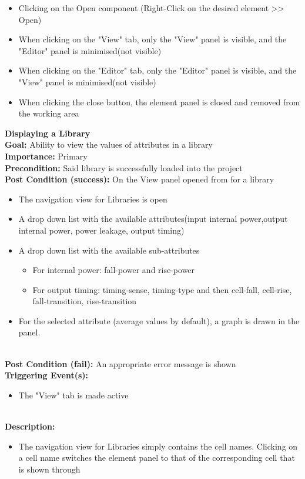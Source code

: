 \documentclass[10pt,a4paper]{report}
\newcommand{\precondition}[1]{
    \textbf{Precondition: } #1 \leavevmode \\
}
\newcommand{\FRDescription}[8]{
    \textbf{#1} \leavevmode \\
    \textbf{Goal: } #2 \leavevmode \\
    \textbf{Importance: } #3 \leavevmode \\
    \precondition{#4}
    \textbf{Post Condition (success): } #5 \leavevmode \\
    \textbf{Post Condition (fail): } #6 \leavevmode \\
    \textbf{Triggering Event(s): } #7 \leavevmode \\
    \textbf{Description: } \leavevmode \\ 
    #8}
\begin{document}
\begin{FR}
{\begin{itemize}
        \item Clicking on the Open component (Right-Click on the desired element >> Open)
    \end{itemize}}
    {\begin{itemize}
        \item When clicking on the "View" tab, only the "View" panel is visible, and the "Editor" panel is minimised(not visible)
        \item When clicking on the "Editor" tab, only the "Editor" panel is visible, and the "View" panel is minimised(not visible)
        \item When clicking the close button, the element panel is closed and removed from the working area 
    \end{itemize}}
    \item \FRDescription{Displaying a Library}
    {Ability to view the values of attributes in a library}
    {Primary}
    {Said library is successfully loaded into the project}
    {On the View panel opened from \label{FR-PREVIOUS} for a library
        \begin{itemize}
            \item The navigation view for Libraries is open
            \item A drop down list with the available attributes(input internal power,output internal power, power leakage, output timing)
            \item A drop down list with the available sub-attributes
            \begin{itemize}
                \item For internal power: fall-power and rise-power
                \item For output timing: timing-sense, timing-type and then cell-fall, cell-rise, fall-transition, rise-transition
            \end{itemize}
            \item For the selected attribute (average values by default), a graph is drawn in the panel.
        \end{itemize}}
    {An appropriate error message is shown}
    {\begin{itemize}
        \item The "View" tab is made active
    \end{itemize}}
    {\begin{itemize}
        \item The navigation view for Libraries simply contains the cell names. Clicking on a cell name switches the element panel to that of the corresponding cell that is shown through \label{FR-BLABLABLA}

\end{itemize}}
\end{FR}
\end{document}
